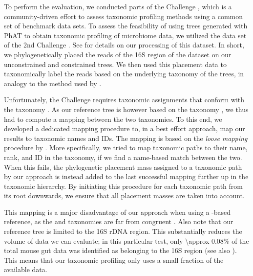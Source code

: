 To perform the evaluation, we conducted parts of the  Challenge \citep{Sczyrba2017},
which is a community-driven effort to assess taxonomic profiling methods using a common set of benchmark data sets.
To assess the feasibility of using trees generated with \ac{PhAT} to obtain taxonomic profiling of microbiome data,
we utilized the  data set of the 2nd  Challenge \citep{Bremges2018}.
See  for details on our processing of this dataset.
In short, we phylogenetically placed the reads of the 16S region of the dataset
on our unconstrained and constrained  trees.
We then used this placement data to taxonomically label the reads
based on the underlying  taxonomy of the trees,
in analogy to the method used by  \citep{Kozlov2016}.

Unfortunately, the  Challenge requires taxonomic assignments
that conform with the  taxonomy \citep{Sayers2009,Benson2009}.
As our reference tree is however based on the  taxonomy \citep{Yilmaz2014},
we thus had to compute a mapping between the two taxonomies. %
To this end, we developed a dedicated mapping procedure to, in a best effort approach,
map our results to  taxonomic names and IDs.
The mapping is based on the \textit{loose mapping} procedure by .
More specifically, we tried to map taxonomic paths to their name, rank, and ID in the  taxonomy,
if we find a name-based match between the two.
When this fails, the phylogenetic placement mass assigned to a taxonomic path by our approach
is instead added to the last successful mapping further up in the taxonomic hierarchy.
By initiating this procedure for each taxonomic path from its root downwards,
we ensure that all placement masses are taken into account.

This mapping is a major disadvantage of our approach when using a -based reference,
as the  and  taxonomies are far from congruent \citep{Balvociute2017}.
Also note that our reference tree is limited to the 16S rDNA region.
This substantially reduces the volume of data we can evaluate;
in this particular test, only \num{\approx 0.08}\% of the total mouse gut data was identified as belonging to the 16S region
(see also ).
This means that our taxonomic profiling only uses a small fraction of the available data.

